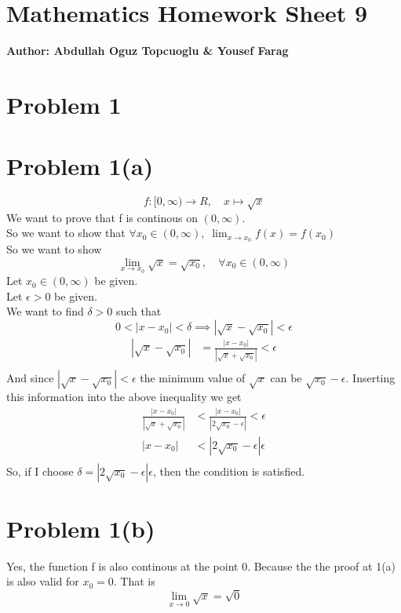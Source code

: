\documentclass{article}
\begin{document}
\section*{\huge Mathematics Homework Sheet 9}
\begin{flushright}
   \textbf{Author: Abdullah Oguz Topcuoglu \& Yousef Farag}
\end{flushright}

\section*{Problem 1}
\section*{Problem 1(a)}

\[
   f: [0,\infty) \rightarrow R, \quad x \mapsto \sqrt{x}
\]
We want to prove that f is continous on \((0,\infty)\). \\
So we want to show that \(\forall x_0 \in (0,\infty), \; \lim_{x \rightarrow x_0} f(x) = f(x_0)\) \\
So we want to show
\[
   \lim_{x \rightarrow x_0} \sqrt{x} = \sqrt{x_0}, \quad \forall x_0 \in (0,\infty)
\]
Let \(x_0 \in (0,\infty)\) be given. \\
Let \(\epsilon > 0\) be given. \\
We want to find \(\delta > 0\) such that
\[
   0 < |x - x_0| < \delta \implies |\sqrt{x} - \sqrt{x_0}| < \epsilon
\]
\begin{align*}
   |\sqrt{x} - \sqrt{x_0}| &= \frac{|x - x_0|}{|\sqrt{x} + \sqrt{x_0}|} < \epsilon \\
\end{align*}
And since \(|\sqrt{x} - \sqrt{x_0}| < \epsilon\) the minimum value of \(\sqrt{x}\) can be \(\sqrt{x_0} - \epsilon\).
Inserting this information into the above inequality we get
\begin{align*}
   \frac{|x - x_0|}{|\sqrt{x} + \sqrt{x_0}|} &< \frac{|x - x_0|}{|2 \sqrt{x_0} - \epsilon|} < \epsilon \\
   |x - x_0| &< |2 \sqrt{x_0} - \epsilon| \epsilon \\
\end{align*}
So, if I choose \(\delta = |2 \sqrt{x_0} - \epsilon| \epsilon\), then the condition is satisfied.

\section*{Problem 1(b)}
Yes, the function f is also continous at the point 0. Because the the proof at 1(a) is also valid for \(x_0 = 0\).
That is
\[
   \lim_{x \rightarrow 0} \sqrt{x} = \sqrt{0}
\]
\end{document}

